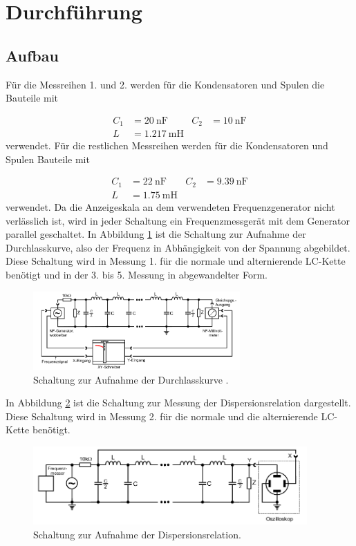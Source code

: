  \section{Durchführung}
\label{sec:Durchführung}


\subsection{Aufbau}

Für die Messreihen 1. und 2. werden für die Kondensatoren und Spulen die
Bauteile mit

\begin{align}
  C_1 & = \SI{20}{\nano\F} & C_2 & = \SI{10}{\nano\F} \\
  L & = \SI{1.217}{\milli\henry}
\end{align}
verwendet. Für die restlichen Messreihen werden für die Kondensatoren und Spulen
Bauteile mit

\begin{align}
  C_1 & = \SI{22}{\nano\F} & C_2 & = \SI{9.39}{\nano\F} \\
  L & = \SI{1.75}{\milli\henry}
\end{align}
verwendet.
Da die Anzeigeskala an dem verwendeten Frequenzgenerator nicht verlässlich ist,
wird in jeder Schaltung ein Frequenzmessgerät mit dem Generator parallel
geschaltet.
In Abbildung \ref{fig:DK} ist die Schaltung zur Aufnahme der Durchlasskurve,
also der Frequenz in Abhängigkeit von der Spannung abgebildet.
Diese Schaltung wird in Messung 1. für die normale und
alternierende LC-Kette benötigt und in der 3. bis 5. Messung in abgewandelter
Form.

\begin{figure}
  \centering
  \includegraphics[height=3cm]{DurchlasskurveLCkette.png}
  \caption{Schaltung zur Aufnahme der Durchlasskurve \cite{anleitung}.}
  \label{fig:DK}
\end{figure}

In Abbildung \ref{fig:DR} ist die Schaltung zur Messung der Dispersionsrelation
dargestellt. Diese Schaltung wird in Messung 2. für die normale und die
alternierende LC-Kette benötigt.

\begin{figure}
  \centering
  \includegraphics[height=3cm]{DispersionC1C2.png}
  \caption{Schaltung zur Aufnahme der Dispersionsrelation\cite{anleitung}.}
  \label{fig:DR}
\end{figure}


